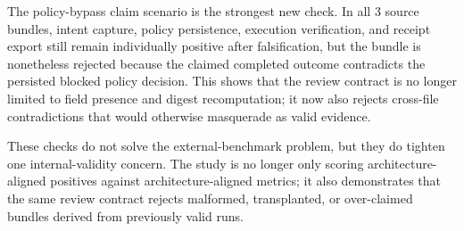 The policy-bypass claim scenario is the strongest new check. In all 3 source bundles, intent capture, policy persistence, execution verification, and receipt export still remain individually positive after falsification, but the bundle is nonetheless rejected because the claimed completed outcome contradicts the persisted blocked policy decision. This shows that the review contract is no longer limited to field presence and digest recomputation; it now also rejects cross-file contradictions that would otherwise masquerade as valid evidence.

These checks do not solve the external-benchmark problem, but they do tighten one internal-validity concern. The study is no longer only scoring architecture-aligned positives against architecture-aligned metrics; it also demonstrates that the same review contract rejects malformed, transplanted, or over-claimed bundles derived from previously valid runs.
